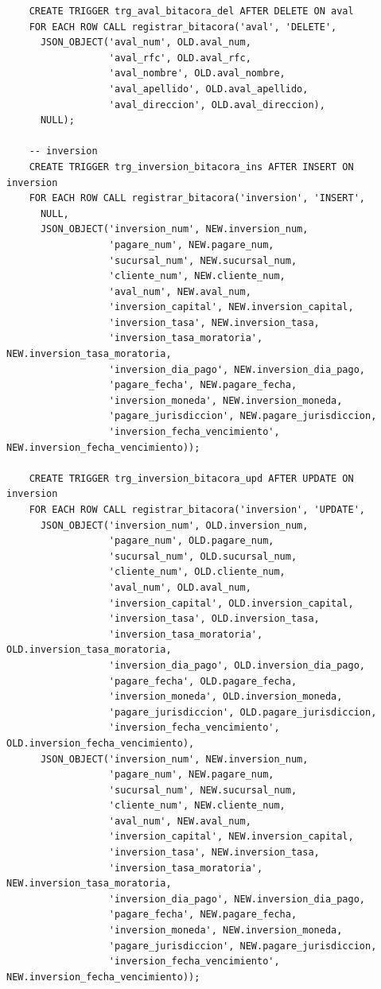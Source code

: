 \begin{verbatim}
	CREATE TRIGGER trg_aval_bitacora_del AFTER DELETE ON aval
	FOR EACH ROW CALL registrar_bitacora('aval', 'DELETE',
	  JSON_OBJECT('aval_num', OLD.aval_num,
	              'aval_rfc', OLD.aval_rfc,
	              'aval_nombre', OLD.aval_nombre,
	              'aval_apellido', OLD.aval_apellido,
	              'aval_direccion', OLD.aval_direccion),
	  NULL);

	-- inversion
	CREATE TRIGGER trg_inversion_bitacora_ins AFTER INSERT ON inversion
	FOR EACH ROW CALL registrar_bitacora('inversion', 'INSERT',
	  NULL,
	  JSON_OBJECT('inversion_num', NEW.inversion_num,
	              'pagare_num', NEW.pagare_num,
	              'sucursal_num', NEW.sucursal_num,
	              'cliente_num', NEW.cliente_num,
	              'aval_num', NEW.aval_num,
	              'inversion_capital', NEW.inversion_capital,
	              'inversion_tasa', NEW.inversion_tasa,
	              'inversion_tasa_moratoria', NEW.inversion_tasa_moratoria,
	              'inversion_dia_pago', NEW.inversion_dia_pago,
	              'pagare_fecha', NEW.pagare_fecha,
	              'inversion_moneda', NEW.inversion_moneda,
	              'pagare_jurisdiccion', NEW.pagare_jurisdiccion,
	              'inversion_fecha_vencimiento', NEW.inversion_fecha_vencimiento));

	CREATE TRIGGER trg_inversion_bitacora_upd AFTER UPDATE ON inversion
	FOR EACH ROW CALL registrar_bitacora('inversion', 'UPDATE',
	  JSON_OBJECT('inversion_num', OLD.inversion_num,
	              'pagare_num', OLD.pagare_num,
	              'sucursal_num', OLD.sucursal_num,
	              'cliente_num', OLD.cliente_num,
	              'aval_num', OLD.aval_num,
	              'inversion_capital', OLD.inversion_capital,
	              'inversion_tasa', OLD.inversion_tasa,
	              'inversion_tasa_moratoria', OLD.inversion_tasa_moratoria,
	              'inversion_dia_pago', OLD.inversion_dia_pago,
	              'pagare_fecha', OLD.pagare_fecha,
	              'inversion_moneda', OLD.inversion_moneda,
	              'pagare_jurisdiccion', OLD.pagare_jurisdiccion,
	              'inversion_fecha_vencimiento', OLD.inversion_fecha_vencimiento),
	  JSON_OBJECT('inversion_num', NEW.inversion_num,
	              'pagare_num', NEW.pagare_num,
	              'sucursal_num', NEW.sucursal_num,
	              'cliente_num', NEW.cliente_num,
	              'aval_num', NEW.aval_num,
	              'inversion_capital', NEW.inversion_capital,
	              'inversion_tasa', NEW.inversion_tasa,
	              'inversion_tasa_moratoria', NEW.inversion_tasa_moratoria,
	              'inversion_dia_pago', NEW.inversion_dia_pago,
	              'pagare_fecha', NEW.pagare_fecha,
	              'inversion_moneda', NEW.inversion_moneda,
	              'pagare_jurisdiccion', NEW.pagare_jurisdiccion,
	              'inversion_fecha_vencimiento', NEW.inversion_fecha_vencimiento));


\end{verbatim}
